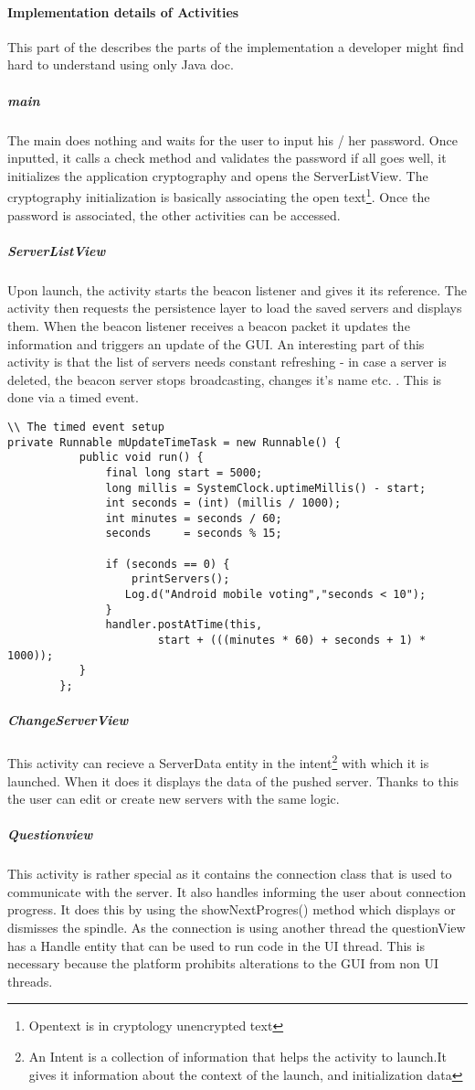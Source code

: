 \documentclass[11pt]{article} %
\begin{document}
\paragraph{Implementation details of Activities}
This part of the describes the parts of the implementation a developer might find hard to understand using only Java doc.
\subparagraph{main}
The main does nothing and waits for the user to input his / her password. Once inputted, it calls a check method and validates the password if all goes well, it initializes the application cryptography and opens the ServerListView. The cryptography initialization is basically associating the open text\footnote{Opentext is in cryptology unencrypted text}. Once the password is associated, the other activities can be accessed.
\subparagraph{ServerListView} 
Upon launch, the activity starts the beacon listener and gives it its reference. The activity then requests the persistence layer to load the saved servers and displays them. When the beacon listener receives a beacon packet it updates the information and triggers an update of the GUI. An interesting part of this activity is that the list of servers needs constant refreshing - in case a server is deleted, the beacon server stops broadcasting, changes it's name etc. . This is done via a timed event.
\begin{lstlisting}
\\ The timed event setup
private Runnable mUpdateTimeTask = new Runnable() {
		   public void run() {
		       final long start = 5000;
		       long millis = SystemClock.uptimeMillis() - start;
		       int seconds = (int) (millis / 1000);
		       int minutes = seconds / 60;
		       seconds     = seconds % 15;

		       if (seconds == 0) {
		    	   printServers(); 
		          Log.d("Android mobile voting","seconds < 10");
		       } 	     
		       handler.postAtTime(this,
		               start + (((minutes * 60) + seconds + 1) * 1000));
		   }
		};
\end{lstlisting}
\subparagraph{ChangeServerView}
This activity can recieve a ServerData entity in the intent\footnote{An Intent is a collection of information that helps the activity to launch.It gives it information about the context of the launch, and initialization data} with which it is launched. When it does it displays the data of the pushed server. Thanks to this the user can edit or create new servers with the same logic.
\subparagraph{Questionview}
This activity is rather special as it contains the connection class that is used to communicate with the server. It also handles informing the user about connection progress. It does this by using the showNextProgres() method which displays or dismisses the spindle. As the connection is using another thread the questionView has a Handle entity that can be used to run code in the UI thread. This is necessary because the platform prohibits alterations to the GUI from non UI threads.
\end{document}
